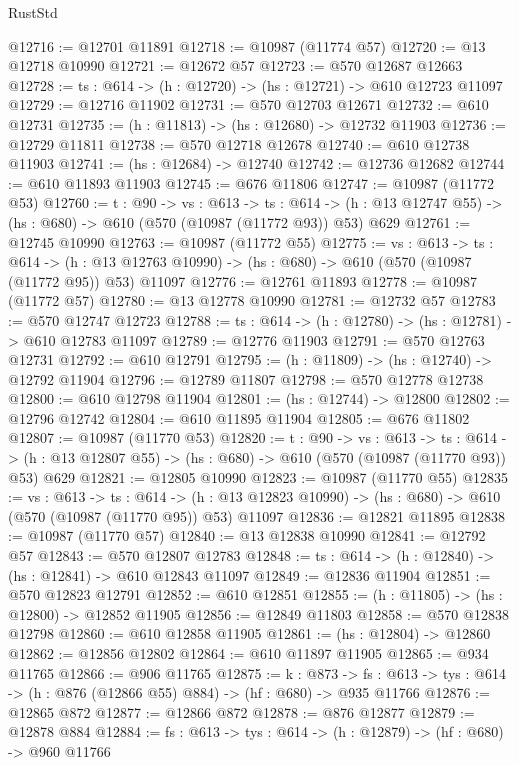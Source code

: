 \begin{lexlean}{RustStd}
\begin{coremodule}
@12716 := @12701 @11891
@12718 := @10987 (@11774 @57)
@12720 := @13 @12718 @10990
@12721 := @12672 @57
@12723 := @570 @12687 @12663
@12728 := {ts : @614} -> (h : @12720) -> (hs : @12721) -> @610 @12723 @11097
@12729 := @12716 @11902
@12731 := @570 @12703 @12671
@12732 := @610 @12731
@12735 := (h : @11813) -> (hs : @12680) -> @12732 @11903
@12736 := @12729 @11811
@12738 := @570 @12718 @12678
@12740 := @610 @12738 @11903
@12741 := (hs : @12684) -> @12740
@12742 := @12736 @12682
@12744 := @610 @11893 @11903
@12745 := @676 @11806
@12747 := @10987 (@11772 @53)
@12760 := {t : @90} ->
  {vs : @613} ->
  {ts : @614} -> (h : @13 @12747 @55) -> (hs : @680) -> @610 (@570 (@10987 (@11772 @93)) @53) @629
@12761 := @12745 @10990
@12763 := @10987 (@11772 @55)
@12775 := {vs : @613} ->
  {ts : @614} ->
  (h : @13 @12763 @10990) -> (hs : @680) -> @610 (@570 (@10987 (@11772 @95)) @53) @11097
@12776 := @12761 @11893
@12778 := @10987 (@11772 @57)
@12780 := @13 @12778 @10990
@12781 := @12732 @57
@12783 := @570 @12747 @12723
@12788 := {ts : @614} -> (h : @12780) -> (hs : @12781) -> @610 @12783 @11097
@12789 := @12776 @11903
@12791 := @570 @12763 @12731
@12792 := @610 @12791
@12795 := (h : @11809) -> (hs : @12740) -> @12792 @11904
@12796 := @12789 @11807
@12798 := @570 @12778 @12738
@12800 := @610 @12798 @11904
@12801 := (hs : @12744) -> @12800
@12802 := @12796 @12742
@12804 := @610 @11895 @11904
@12805 := @676 @11802
@12807 := @10987 (@11770 @53)
@12820 := {t : @90} ->
  {vs : @613} ->
  {ts : @614} -> (h : @13 @12807 @55) -> (hs : @680) -> @610 (@570 (@10987 (@11770 @93)) @53) @629
@12821 := @12805 @10990
@12823 := @10987 (@11770 @55)
@12835 := {vs : @613} ->
  {ts : @614} ->
  (h : @13 @12823 @10990) -> (hs : @680) -> @610 (@570 (@10987 (@11770 @95)) @53) @11097
@12836 := @12821 @11895
@12838 := @10987 (@11770 @57)
@12840 := @13 @12838 @10990
@12841 := @12792 @57
@12843 := @570 @12807 @12783
@12848 := {ts : @614} -> (h : @12840) -> (hs : @12841) -> @610 @12843 @11097
@12849 := @12836 @11904
@12851 := @570 @12823 @12791
@12852 := @610 @12851
@12855 := (h : @11805) -> (hs : @12800) -> @12852 @11905
@12856 := @12849 @11803
@12858 := @570 @12838 @12798
@12860 := @610 @12858 @11905
@12861 := (hs : @12804) -> @12860
@12862 := @12856 @12802
@12864 := @610 @11897 @11905
@12865 := @934 @11765
@12866 := @906 @11765
@12875 := {k : @873} ->
  {fs : @613} -> {tys : @614} -> (h : @876 (@12866 @55) @884) -> (hf : @680) -> @935 @11766
@12876 := @12865 @872
@12877 := @12866 @872
@12878 := @876 @12877
@12879 := @12878 @884
@12884 := {fs : @613} -> {tys : @614} -> (h : @12879) -> (hf : @680) -> @960 @11766

\end{coremodule}
\end{lexlean}
